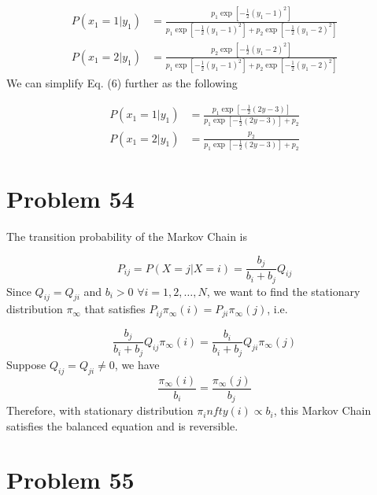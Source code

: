 \documentclass[a4paper, 11pt]{article}
\begin{document}
\begin{equation}
\begin{split}
P(x_1 = 1|y_1) & = \frac{p_1\exp\left[{-\frac{1}{2}(y_1-1)^2}\right]}{p_1\exp\left[{-\frac{1}{2}(y_1-1)^2}\right] + p_2\exp\left[{-\frac{1}{2}(y_1-2)^2}\right]} \\
P(x_1 = 2|y_1) & = \frac{p_2\exp\left[{-\frac{1}{2}(y_1-2)^2}\right]}{p_1\exp\left[{-\frac{1}{2}(y_1-1)^2}\right] + p_2\exp\left[{-\frac{1}{2}(y_1-2)^2}\right]}
\end{split}
\end{equation}
We can simplify Eq. (6) further as the following

\begin{equation}
\begin{split}
P(x_1 = 1|y_1) & = \frac{p_1\exp\left[{-\frac{1}{2}(2y-3)}\right]}{p_1\exp\left[{-\frac{1}{2}(2y-3)}\right] + p_2} \\
P(x_1 = 2|y_1) & = \frac{p_2}{p_1\exp\left[{-\frac{1}{2}(2y-3)}\right] + p_2}
\end{split}
\end{equation}


\section*{Problem 54}

The transition probability of the Markov Chain is 

\begin{equation}
P_{ij} = P(X=j|X=i) = \frac{b_j}{b_i + b_j}Q_{ij}
\end{equation}
Since $Q_{ij} = Q_{ji}$ and $b_i > 0$ $\forall i=1,2,\dots, N$, we want to find the stationary distribution $\pi_\infty$ that satisfies $P_{ij}\pi_\infty(i) = P_{ji}\pi_\infty(j)$, i.e.

\begin{equation}
\frac{b_j}{b_i + b_j}Q_{ij}\pi_\infty(i) = \frac{b_i}{b_i + b_j}Q_{ji}\pi_\infty(j)
\end{equation}
Suppose $Q_{ij}=Q_{ji}\neq 0$, we have
\begin{equation}
\frac{\pi_\infty(i)}{b_i} = \frac{\pi_\infty(j)}{b_j}
\end{equation}
Therefore, with stationary distribution $\pi_infty(i) \propto b_i$, this Markov Chain satisfies the balanced equation and is reversible. 


\section*{Problem 55}
\end{document}
